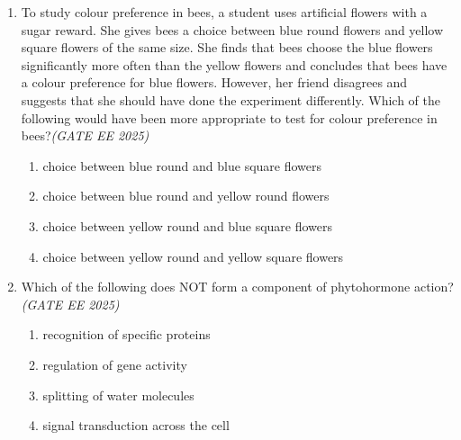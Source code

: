 \documentclass[11pt,a4paper]{article}
\begin{document}
\begin{enumerate}[leftmargin=*,label=\textbf{Q.\arabic*},resume]

\item To study colour preference in bees, a student uses artificial flowers with a sugar reward. She gives bees a choice between blue round flowers and yellow square flowers of the same size. She finds that bees choose the blue flowers significantly more often than the yellow flowers and concludes that bees have a colour preference for blue flowers. However, her friend disagrees and suggests that she should have done the experiment differently. Which of the following would have been more appropriate to test for colour preference in bees?\hfill \textit{(GATE EE 2025)}
\begin{multicols}{2}
\begin{enumerate}[label=(\Alph*)]
\item choice between blue round and blue square flowers
\item choice between blue round and yellow round flowers
\item choice between yellow round and blue square flowers
\item choice between yellow round and yellow square flowers
\end{enumerate}
\end{multicols}

\item Which of the following does NOT form a component of phytohormone action?\hfill \textit{(GATE EE 2025)}
\begin{multicols}{2}
\begin{enumerate}[label=(\Alph*)]
\item recognition of specific proteins
\item regulation of gene activity
\item splitting of water molecules
\item signal transduction across the cell
\end{enumerate}
\end{multicols}


\end{enumerate}
\end{document}
